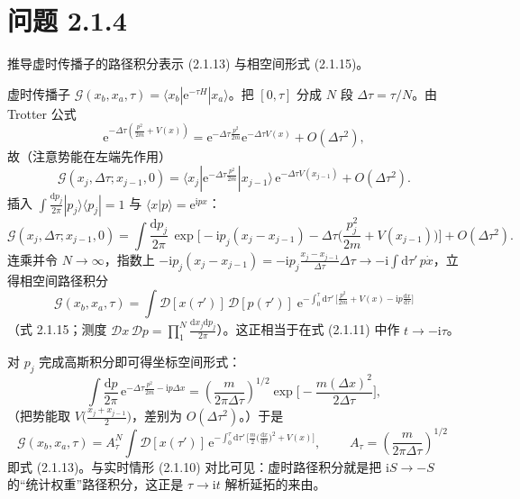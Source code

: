 \section*{问题 2.1.4}
\begin{problem}
推导虚时传播子的路径积分表示 (2.1.13) 与相空间形式 (2.1.15)。
\end{problem}
\solution
虚时传播子 $\mathcal G(x_b,x_a,\tau)=\langle x_b|\mathrm{e}^{-\tau H}|x_a\rangle$。把 $[0,\tau]$ 分成 $N$ 段 $\Delta\tau=\tau/N$。由 Trotter 公式
\begin{equation*}
\mathrm{e}^{-\Delta\tau\left(\frac{p^2}{2m}+V(x)\right)}
=\mathrm{e}^{-\Delta\tau\frac{p^2}{2m}}\mathrm{e}^{-\Delta\tau V(x)}+O(\Delta\tau^2),
\end{equation*}
故（注意势能在左端先作用）
\begin{equation*}
\mathcal G(x_j,\Delta\tau;x_{j-1},0)
=\langle x_j|\mathrm{e}^{-\Delta\tau\frac{p^2}{2m}}|x_{j-1}\rangle\,\mathrm{e}^{-\Delta\tau V(x_{j-1})}+O(\Delta\tau^2).
\end{equation*}
插入 $\int\frac{\mathrm{d}p_j}{2\pi}|p_j\rangle\langle p_j|=1$ 与 $\langle x|p\rangle=\mathrm{e}^{\mathrm{i}px}$：
\begin{equation*}
\mathcal G(x_j,\Delta\tau;x_{j-1},0)
=\int\frac{\mathrm{d}p_j}{2\pi}\,
\exp\Big[-\mathrm{i}p_j(x_j-x_{j-1})-\Delta\tau\Big(\frac{p_j^2}{2m}+V(x_{j-1})\Big)\Big]+O(\Delta\tau^2).
\end{equation*}
连乘并令 $N\to\infty$，指数上 $-\mathrm{i}p_j(x_j-x_{j-1})=-\mathrm{i}p_j\frac{x_j-x_{j-1}}{\Delta\tau}\Delta\tau\to-\mathrm{i}\int\mathrm{d}\tau'\,p\dot x$，立得相空间路径积分
\begin{equation*}
\boxed{\;\mathcal G(x_b,x_a,\tau)=\int\mathcal D[x(\tau')]\,\mathcal D[p(\tau')]\;
\mathrm{e}^{-\int_0^\tau\mathrm{d}\tau'\,\big[\frac{p^2}{2m}+V(x)-\mathrm{i}p\frac{\mathrm{d}x}{\mathrm{d}\tau}\big]}\;}
\end{equation*}
（式 2.1.15；测度 $\mathcal D x\,\mathcal Dp=\prod_1^N\frac{\mathrm{d}x_j\mathrm{d}p_j}{2\pi}$）。这正相当于在式 (2.1.11) 中作 $t\to-\mathrm{i}\tau$。

对 $p_j$ 完成高斯积分即可得坐标空间形式：
\begin{equation*}
\int\frac{\mathrm{d}p}{2\pi}\,
\mathrm{e}^{-\Delta\tau\frac{p^2}{2m}-\mathrm{i}p\Delta x}
=\left(\frac{m}{2\pi\Delta\tau}\right)^{1/2}
\exp\Big[-\frac{m(\Delta x)^2}{2\Delta\tau}\Big],
\end{equation*}
（把势能取 $V\big(\frac{x_j+x_{j-1}}2\big)$，差别为 $O(\Delta\tau^2)$。）于是
\begin{equation*}
\mathcal G(x_b,x_a,\tau)=A_\tau^N\int\mathcal D[x(\tau')]\,
\mathrm{e}^{-\int_0^\tau\mathrm{d}\tau'\,\big[\frac m2\big(\frac{\mathrm{d}x}{\mathrm{d}\tau}\big)^2+V(x)\big]},
\qquad
\boxed{\;A_\tau=\left(\frac{m}{2\pi\Delta\tau}\right)^{1/2}\;}
\end{equation*}
即式 (2.1.13)。与实时情形 (2.1.10) 对比可见：虚时路径积分就是把 $\mathrm{i}S\to-S$ 的“统计权重”路径积分，这正是 $\tau\to\mathrm{i}t$ 解析延拓的来由。

